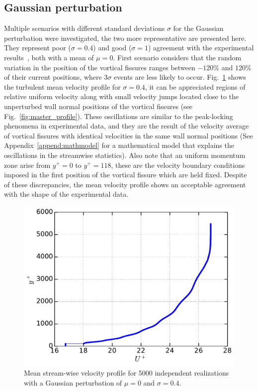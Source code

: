 \documentclass[aps,reprint,amsmath,amssymb,pra]{revtex4-1}%
\begin{document}
\subsection{Gaussian perturbation\label{subsec:gp}}  
Multiple scenarios with different standard deviations $\sigma$ for the Gaussian perturbation were investigated, the two more representative are presented here. They represent poor ($\sigma=0.4$) and good ($\sigma=1$) agreement with the experimental results~\cite{Vincenti2013,FLM}, both with a mean of $\mu=0$. First scenario considers that the random variation in the position of the vortical fissures ranges between $-120\%$ and $120\%$ of their current positions, where $3\sigma$ events are less likely to occur. Fig.~\ref{fig:mean_profile} shows the turbulent mean velocity profile for $\sigma=0.4$, it can be appreciated regions of relative uniform velocity along with small velocity jumps located close to the unperturbed wall normal positions of the vortical fissures (see Fig.~\ref{fig:master_profile}). These oscillations are similar to the peak-locking phenomena in experimental data, and they are the result of  the velocity average of vortical fissures with identical velocities in the same wall normal positions (See Appendix~\ref{append:mathmodel} for a mathematical model that explains the oscillations in the streamwise statistics). Also note that an uniform momentum zone arise from $y^+=0$ to $y^+=118$, these are the velocity boundary conditions imposed in the first position of the vortical fissure which are held fixed. Despite of these discrepancies, the mean velocity profile shows an acceptable agreement with the shape of the experimental data.\\
\begin{figure}[b]
\includegraphics[scale=0.45]{figures/Master_averaged_step_profile_5000_assembles}
\caption{\label{fig:mean_profile} Mean stream-wise velocity profile for 5000 independent realizations with a Gaussian perturbation of $\mu=0$ and $\sigma=0.4$.}
\end{figure}
\end{document}
